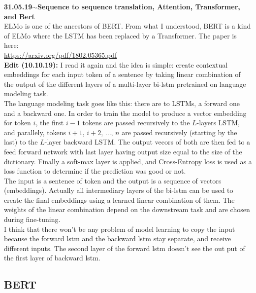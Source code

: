 \documentclass[11pt,a4paper]{article}
\newenvironment{loggentry}[2]%
{\noindent\textbf{#1}\hspace{1cm}$\mathbf{\sim}$\text{ }\textbf{#2}\\}{\vspace{0.5cm}}
\begin{document}
\begin{loggentry}{31.05.19}{Sequence to sequence translation, Attention, Transformer, and Bert}
ELMo is one of the ancestors of BERT. From what I understood, BERT is a kind of ELMo where the LSTM has been replaced by a Transformer. The paper is here:\\
\url{https://arxiv.org/pdf/1802.05365.pdf}\\
\textbf{Edit (10.10.19):} I read it again and the idea is simple: create contextual embeddings for each input token of a sentence by taking linear combination of the output of the different layers of a multi-layer bi-lstm pretrained on language modeling task.\\
The language modeling task goes like this: there are to LSTMs, a forward one and a backward one. In order to train the model to produce a vector embedding for token $i$, the first $i-1$ tokens are passed recursively to the $L$-layers LSTM, and parallely, tokens $i+1$, $i+2$, ..., $n$ are passed recursively (starting by the last) to the $L$-layer backward LSTM. The output vecors of both are then fed to a feed forward network with last layer having output size equal to the size of the dictionary. Finally a soft-max layer is applied, and Cross-Entropy loss is used as a loss function to determine if the prediction was good or not.\\
The input is a sentence of token and the output is a sequence of vectors (embeddings). Actually all intermediary layers of the bi-lstm can be used to create the final embeddings using a learned linear combination of them. The weights of the linear combination depend on the downstream task and are chosen during fine-tuning.\\
I think that there won't be any problem of model learning to copy the input because the forward lstm and the backward lstm stay separate, and receive different inputs. The second layer of the forward lstm doesn't see the out put of the first layer of backward lstm.


\subsection{BERT}


\end{loggentry}
\end{document}

